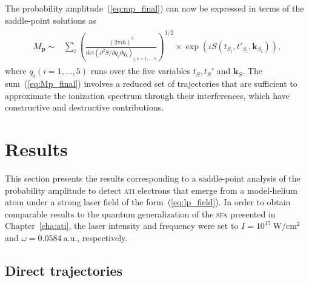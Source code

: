 The probability amplitude~(\ref{eq:mp_final}) can now be expressed in
terms of the saddle-point solutions as~\cite{KopoldOptComm2000}
%
\begin{eqnarray}
\label{eq:Mp_final}
\begin{split}
M_{\mathbf{p}} \sim & \sum\limits_{i} \left( \frac{(2\pi i \hbar)^{5}}
{\mathrm{det} (\partial^{2}S / \partial q_{j} \partial q_{k})_{j,k = 1, \dots, 5}}
\right)^{1/2} \times \exp(i S(t_{S_{i}}, t'_{S_{i}}, \mathbf{k}_{S_{i}})),
\end{split}
\end{eqnarray}
%
where $q_{i}(i = 1,\dots,5)$ runs over the five variables $t_{S},
t_{S}'$ and $\mathbf{k}_{S}$. The sum~(\ref{eq:Mp_final}) involves a
reduced set of trajectories that are sufficient to approximate the
ionization spectrum through their interferences, which have
constructive and destructive contributions.


\section{\label{sec:spa_results} Results}

This section presents the results corresponding to a saddle-point
analysis of the probability amplitude to detect \textsc{ati} electrons
that emerge from a model-helium atom under a strong laser field of the
form~(\ref{eq:lp_field}). In order to obtain comparable results to the
quantum generalization of the \textsc{sfa} presented in
Chapter~\ref{cha:ati}, the laser intensity and frequency were set to
$I = 10^{15}\ \mathrm{W/cm^{2}}$ and $\omega = 0.0584\ \mathrm{a.u.}$,
respectively.


\subsection{\label{sec:spa_direct} Direct trajectories}

